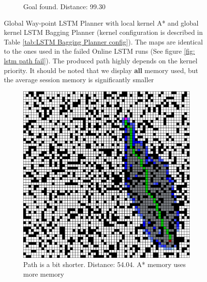 \begin{figure}[h!]
\begin{subfigure}[b]{0.33\linewidth}
     \caption{Goal found. Distance: 99.30 \newline}%
  \end{subfigure}
  \caption{Global Way-point LSTM Planner with local kernel A* and global kernel LSTM Bagging Planner (kernel configuration is described in Table \ref{tab:LSTM Bagging Planner config}). The maps are identical to the ones used in the failed Online LSTM runs (See figure \ref{fig: lstm path fail}). The produced path highly depends on the kernel priority. It should be noted that we display \textbf{all} memory used, but the average session memory is significantly smaller}
  \label{fig: Way runs}
\end{figure}

\begin{figure}[h!]
  \centerfloat
  \begin{subfigure}[b]{0.33\linewidth}
    \includegraphics[width=\linewidth]{images/a_star_1_map.png}
    \caption{Path is a bit shorter. Distance: 54.04. A* memory uses more memory}
  \end{subfigure}
  \hfill
  \begin{subfigure}[b]{0.33\linewidth}

\end{subfigure}
\end{figure}
